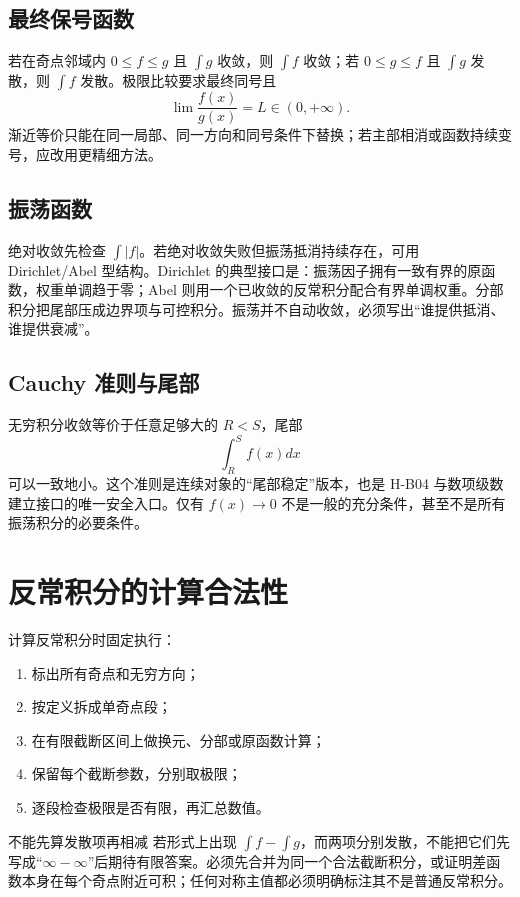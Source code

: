 \documentclass[11pt,a4paper,fontset=fandol]{ctexart}
\begin{document}
\subsection{最终保号函数}

若在奇点邻域内 $0\le f\le g$ 且 $\int g$ 收敛，则 $\int f$ 收敛；若 $0\le g\le f$ 且 $\int g$ 发散，则 $\int f$ 发散。极限比较要求最终同号且
\[
\lim\frac{f(x)}{g(x)}=L\in(0,+\infty).
\]
渐近等价只能在同一局部、同一方向和同号条件下替换；若主部相消或函数持续变号，应改用更精细方法。

\subsection{振荡函数}

绝对收敛先检查 $\int|f|$。若绝对收敛失败但振荡抵消持续存在，可用 Dirichlet/Abel 型结构。Dirichlet 的典型接口是：振荡因子拥有一致有界的原函数，权重单调趋于零；Abel 则用一个已收敛的反常积分配合有界单调权重。分部积分把尾部压成边界项与可控积分。振荡并不自动收敛，必须写出“谁提供抵消、谁提供衰减”。

\subsection{Cauchy 准则与尾部}

无穷积分收敛等价于任意足够大的 $R<S$，尾部
\[
\int_R^S{f(x)}dx
\]
可以一致地小。这个准则是连续对象的“尾部稳定”版本，也是 H-B04 与数项级数建立接口的唯一安全入口。仅有 $f(x)\to0$ 不是一般的充分条件，甚至不是所有振荡积分的必要条件。

\section{反常积分的计算合法性}

计算反常积分时固定执行：
\begin{enumerate}
  \item 标出所有奇点和无穷方向；
  \item 按定义拆成单奇点段；
  \item 在有限截断区间上做换元、分部或原函数计算；
  \item 保留每个截断参数，分别取极限；
  \item 逐段检查极限是否有限，再汇总数值。
\end{enumerate}

\begin{warnbox}{不能先算发散项再相减}
若形式上出现 $\int f-\int g$，而两项分别发散，不能把它们先写成“$\infty-\infty$”后期待有限答案。必须先合并为同一个合法截断积分，或证明差函数本身在每个奇点附近可积；任何对称主值都必须明确标注其不是普通反常积分。
\end{warnbox}
\end{document}
